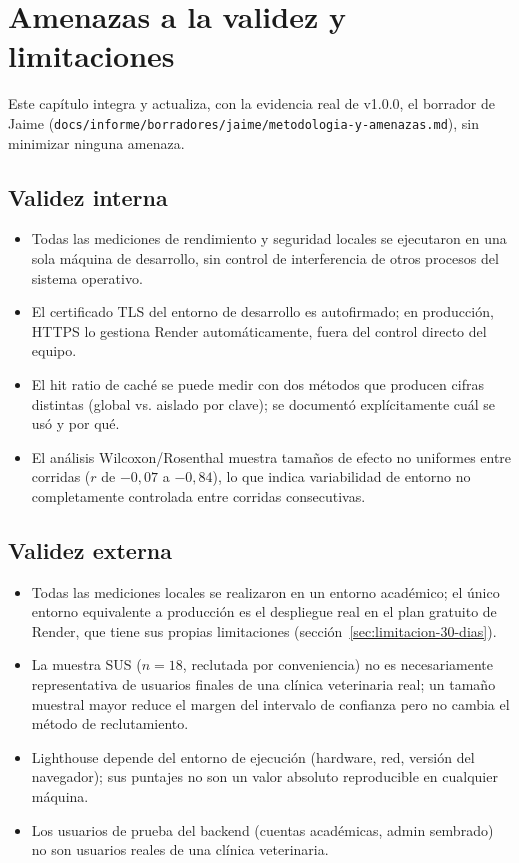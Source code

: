 \chapter{Amenazas a la validez y limitaciones}
\label{cap:amenazas-limitaciones-final}

Este cap\'itulo integra y actualiza, con la evidencia real de v1.0.0, el
borrador de Jaime (\texttt{docs/informe/borradores/jaime/metodologia-y-amenazas.md}),
sin minimizar ninguna amenaza.

\section{Validez interna}

\begin{itemize}[nosep]
  \item Todas las mediciones de rendimiento y seguridad locales se
    ejecutaron en una sola m\'aquina de desarrollo, sin control de
    interferencia de otros procesos del sistema operativo.
  \item El certificado TLS del entorno de desarrollo es autofirmado; en
    producci\'on, HTTPS lo gestiona Render autom\'aticamente, fuera del
    control directo del equipo.
  \item El hit ratio de cach\'e se puede medir con dos m\'etodos que
    producen cifras distintas (global vs. aislado por clave); se document\'o
    expl\'icitamente cu\'al se us\'o y por qu\'e.
  \item El an\'alisis Wilcoxon/Rosenthal muestra tama\~nos de efecto no
    uniformes entre corridas ($r$ de $-0{,}07$ a $-0{,}84$), lo que indica
    variabilidad de entorno no completamente controlada entre corridas
    consecutivas.
\end{itemize}

\section{Validez externa}

\begin{itemize}[nosep]
  \item Todas las mediciones locales se realizaron en un entorno
    acad\'emico; el \'unico entorno equivalente a producci\'on es el
    despliegue real en el plan gratuito de Render, que tiene sus propias
    limitaciones (secci\'on~\ref{sec:limitacion-30-dias}).
  \item La muestra SUS ($n=18$, reclutada por conveniencia) no es
    necesariamente representativa de usuarios finales de una cl\'inica
    veterinaria real; un tama\~no muestral mayor reduce el margen del
    intervalo de confianza pero no cambia el m\'etodo de reclutamiento.
  \item Lighthouse depende del entorno de ejecuci\'on (hardware, red,
    versi\'on del navegador); sus puntajes no son un valor absoluto
    reproducible en cualquier m\'aquina.
  \item Los usuarios de prueba del backend (cuentas acad\'emicas, admin
    sembrado) no son usuarios reales de una cl\'inica veterinaria.
\end{itemize}

